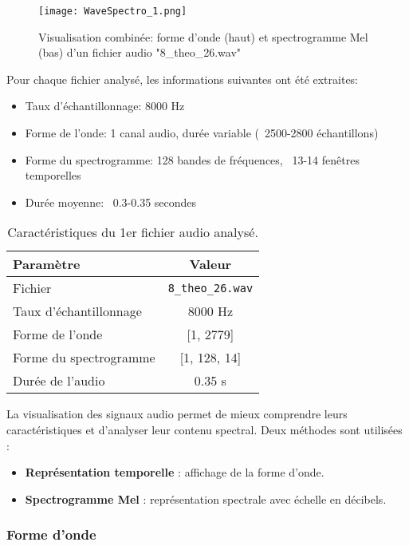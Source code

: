\begin{figure}[H]
    \centering
    \texttt{[image: WaveSpectro\_1.png]}
    \caption{Visualisation combinée: forme d'onde (haut) et spectrogramme Mel (bas) d'un fichier audio "8\_theo\_26.wav"}
    \label{fig:waveform_spec_1}
\end{figure}

Pour chaque fichier analysé, les informations suivantes ont été extraites:
\begin{itemize}
    \item Taux d'échantillonnage: 8000 Hz
    \item Forme de l'onde: 1 canal audio, durée variable (~2500-2800 échantillons)
    \item Forme du spectrogramme: 128 bandes de fréquences, ~13-14 fenêtres temporelles
    \item Durée moyenne: ~0.3-0.35 secondes
\end{itemize}

\begin{table}[H]
    \centering
    \begin{tabular}{|l|c|}
        \hline
        \textbf{Paramètre} & \textbf{Valeur} \\
        \hline
        Fichier & \texttt{8\_theo\_26.wav} \\
        Taux d’échantillonnage & 8000 Hz \\
        Forme de l’onde & [1, 2779] \\
        Forme du spectrogramme & [1, 128, 14] \\
        Durée de l’audio & 0.35 s \\
        \hline
    \end{tabular}
    \caption{Caractéristiques du 1er fichier audio analysé.}
    \label{tab:audio_info}
\end{table}

La visualisation des signaux audio permet de mieux comprendre leurs caractéristiques et d’analyser leur contenu spectral. Deux méthodes sont utilisées :

\begin{itemize}
    \item \textbf{Représentation temporelle} : affichage de la forme d’onde.
    \item \textbf{Spectrogramme Mel} : représentation spectrale avec échelle en décibels.
\end{itemize}

\subsubsection{Forme d’onde}

